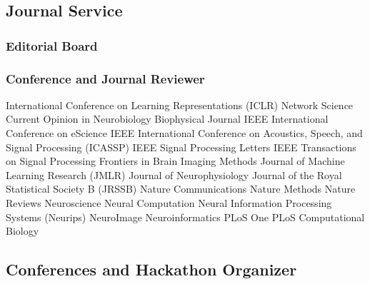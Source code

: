 \documentclass[10pt,colorlinks=true,urlcolor=blue]{moderncv}
\begin{document}
\subsection{Journal Service}

\subsubsection{Editorial Board}

\subsubsection{Conference and Journal Reviewer}
    \cventry {} {International Conference on Learning Representations (ICLR)} {}{}{}{}
    \cventry {} {Network Science} {}{}{}{}
    \cventry {} {Current Opinion in Neurobiology} {}{}{}{}
    \cventry {} {Biophysical Journal} {}{}{}{}
    \cventry {} {IEEE International Conference on eScience} {}{}{}{}
    \cventry {} {IEEE International Conference on Acoustics, Speech, and Signal Processing (ICASSP)}{}{}{}{}
    \cventry {} {IEEE Signal Processing Letters} {} {} {} {}
    \cventry {} {IEEE Transactions on Signal Processing} {}{}{}{}
    \cventry {} {Frontiers in Brain Imaging Methods} {}{}{}{}
    \cventry {} {Journal of Machine Learning Research (JMLR)} {}{}{}{}
    \cventry {} {Journal of Neurophysiology} {}{}{}{}
    \cventry {} {Journal of the Royal Statistical Society B (JRSSB)} {}{}{}{}
    \cventry {} {Nature Communications} {}{}{}{}
    \cventry {} {Nature Methods} {}{}{}{}
    \cventry {} {Nature Reviews Neuroscience} {}{}{}{}
    \cventry {} {Neural Computation} {}{}{}{}
    \cventry {} {Neural Information Processing Systems (Neurips)} {}{}{}{}
    \cventry {} {NeuroImage} {}{}{}{}
    \cventry {} {Neuroinformatics} {}{}{}{}
    \cventry {} {PLoS One} {}{}{}{}
    \cventry {} {PLoS Computational Biology} {}{}{}{}


\subsection{Conferences and Hackathon Organizer}
\end{document}
